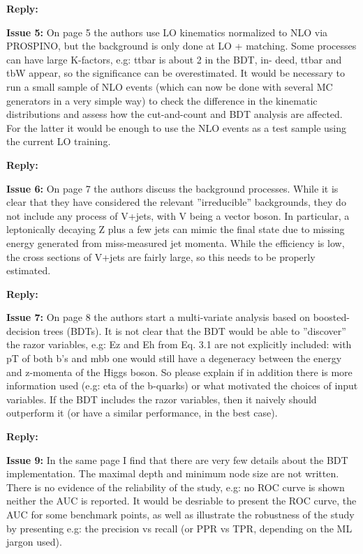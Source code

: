 \documentclass[12pt]{article}
\begin{document}
\noindent\textbf{Reply:} 

\bigskip

\noindent\textbf{Issue 5:} On page 5 the authors use LO kinematics normalized
to NLO via PROSPINO, but the background is only done at LO + matching. Some
processes can have large K-factors, e.g: ttbar is about 2 in the BDT, in- deed,
ttbar and tbW appear, so the significance can be overestimated. It would be
necessary to run a small sample of NLO events (which can now be done with
several MC generators in a very simple way) to check the difference in the
kinematic distributions and assess how the cut-and-count and BDT analysis are
affected. For the latter it would be enough to use the NLO events as a test
sample using the current LO training.

\noindent\textbf{Reply:} 

\bigskip

\noindent\textbf{Issue 6:} On page 7 the authors discuss the background
processes. While it is clear that they have considered the relevant
”irreducible” backgrounds, they do not include any process of V+jets, with V
being a vector boson. In particular, a leptonically decaying Z plus a few jets
can mimic the final state due to missing energy generated from miss-measured
jet momenta. While the efficiency is low, the cross sections of V+jets are
fairly large, so this needs to be properly estimated.

\noindent\textbf{Reply:} 

\bigskip

\noindent\textbf{Issue 7:} On page 8 the authors start a multi-variate analysis
based on boosted- decision trees (BDTs). It is not clear that the BDT would be
able to ”discover” the razor variables, e.g: Ez and Eh from Eq. 3.1 are not
explicitly included: with pT of both b’s and mbb one would still have a
degeneracy between the energy and z-momenta of the Higgs boson. So please
explain if in addition there is more information used (e.g: eta of the
b-quarks) or what motivated the choices of input variables. If the BDT includes
the razor variables, then it naively should outperform it (or have a similar
performance, in the best case).

\noindent\textbf{Reply:} 

\bigskip

\noindent\textbf{Issue 9:} In the same page I find that there are very few details about the BDT
implementation. The maximal depth and minimum node size are not written. There
is no evidence of the reliability of the study, e.g: no ROC curve is shown
neither the AUC is reported. It would be desriable to present the ROC curve,
the AUC for some benchmark points, as well as illustrate the robustness of the
study by presenting e.g: the precision vs recall (or PPR vs TPR, depending on
the ML jargon used).
\end{document}
